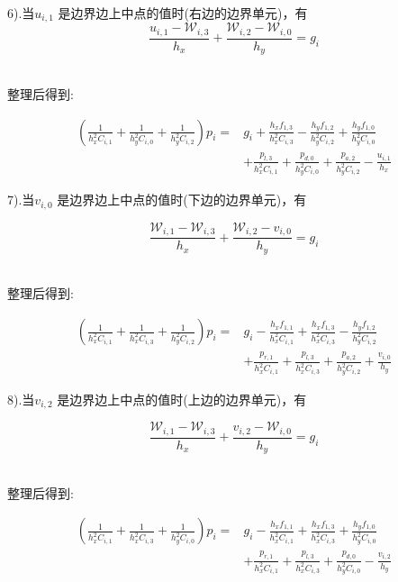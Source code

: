 \documentclass[leqno]{article}
\begin{document}
6).当$u_{i,1}$ 是边界边上中点的值时(右边的边界单元)，有
\begin{equation*}
\frac{ u_{i,1} - \mathcal{W}_{i,3}}{h_x} + \frac{ \mathcal{W}_{i,2} - \mathcal{W}_{i,0}}{h_y} = g_i
\end{equation*}　

整理后得到:

\begin{equation*}
\begin{aligned}
(\frac{1}{h_x^2C_{i,1}} + \frac{1}{h_y^2C_{i,0}} + \frac{1}{h_y^2C_{i,2}})p_i = & g_i + \frac{h_xf_{1,3}}{h_x^2C_{i,3}} - \frac{h_yf_{1,2}}{h_y^2C_{i,2}} + \frac{h_yf_{1,0}}{h_y^2C_{i,0}}\\
& + \frac{p_{l,3}}{h_x^2C_{i,1}} + \frac{p_{d,0}}{h_y^2C_{i,0}} + \frac{p_{a,2}}{h_y^2C_{i,2}} - \frac{u_{i,1}}{h_x}
\end{aligned}
\end{equation*}

7).当$v_{i,0}$ 是边界边上中点的值时(下边的边界单元)，有

\begin{equation*}
\frac{ \mathcal{W}_{i,1} - \mathcal{W}_{i,3}}{h_x} + \frac{\mathcal{W}_{i,2}- v_{i,0}}{h_y} = g_i
\end{equation*}　

整理后得到:

\begin{equation*}
\begin{aligned}
(\frac{1}{h_x^2C_{i,1}} + \frac{1}{h_x^2C_{i,3}} + \frac{1}{h_y^2C_{i,2}})p_i =& g_i - \frac{h_xf_{1,1}}{h_x^2C_{i,1}} + \frac{h_xf_{1,3}}{h_x^2C_{i,3}} - \frac{h_yf_{1,2}}{h_y^2C_{i,2}}\\
& + \frac{p_{r,1}}{h_x^2C_{i,1}} + \frac{p_{l,3}}{h_x^2C_{i,3}} + \frac{p_{a,2}}{h_y^2C_{i,2}} + \frac{v_{i,0}}{h_y}
\end{aligned}
\end{equation*}

8).当$v_{i,2}$ 是边界边上中点的值时(上边的边界单元)，有

\begin{equation*}
\frac{ \mathcal{W}_{i,1} - \mathcal{W}_{i,3}}{h_x} + \frac{ v_{i,2} - \mathcal{W}_{i,0}}{h_y} = g_i
\end{equation*}　

整理后得到:

\begin{equation*}
\begin{aligned}
(\frac{1}{h_x^2C_{i,1}} + \frac{1}{h_x^2C_{i,3}} + \frac{1}{h_y^2C_{i,0}})p_i =& g_i - \frac{h_xf_{1,1}}{h_x^2C_{i,1}} + \frac{h_xf_{1,3}}{h_x^2C_{i,3}} + \frac{h_yf_{1,0}}{h_y^2C_{i,0}}\\
& + \frac{p_{r,1}}{h_x^2C_{i,1}} + \frac{p_{l,3}}{h_x^2C_{i,3}} + \frac{p_{d,0}}{h_y^2C_{i,0}} - \frac{v_{i,2}}{h_y}
\end{aligned}
\end{equation*}
\end{document}
